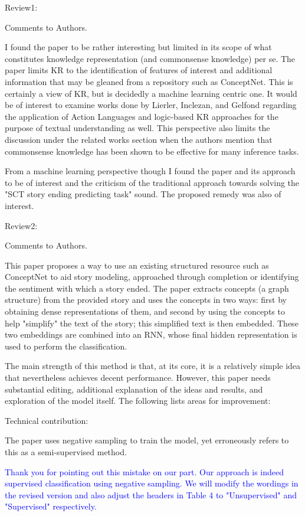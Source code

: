 \documentclass{article}
\newcommand{\shanshan}[1]{\textcolor{blue}{ #1}}
\begin{document}
Review1:

Comments to Authors.

I found the paper to be rather interesting but limited in its scope of what constitutes knowledge representation (and commonsense knowledge) per se. The paper limits KR to the identification of features of interest and additional information that may be gleaned from a repository such as ConceptNet. This is certainly a view of KR, but is decidedly a machine learning centric one. It would be of interest to examine works done by Lierler, Inclezan, and Gelfond regarding the application of Action Languages and logic-based KR approaches for the purpose of textual understanding as well. This perspective also limits the discussion under the related works section when the authors mention that commonsense knowledge has been shown to be effective for many inference tasks.

From a machine learning perspective though I found the paper and its approach to be of interest and the criticism of the traditional approach towards solving the "SCT story ending predicting task" sound. The proposed remedy was also of interest.

Review2:

Comments to Authors.

This paper proposes a way to use an existing structured resource such as ConceptNet to aid story modeling, approached through completion or identifying the sentiment with which a story ended. The paper extracts concepts (a graph structure) from the provided story and uses the concepts in two ways: first by obtaining dense representations of them, and second by using the concepts to help "simplify" the text of the story; this simplified text is then embedded. These two embeddings are combined into an RNN, whose final hidden representation is used to perform the classification.

The main strength of this method is that, at its core, it is a relatively simple idea that nevertheless achieves decent performance. However, this paper needs substantial editing, additional explanation of the ideas and results, and exploration of the model itself. The following lists areas for improvement:

Technical contribution:

The paper uses negative sampling to train the model, yet erroneously refers to this as a semi-supervised method.

\shanshan{Thank you for pointing out this mistake on our part. Our approach is indeed supervised classification using negative sampling. We will modify the wordings in the revised version and also adjust the headers in Table 4 to "Unsupervised" and "Supervised" respectively.}
\end{document}
